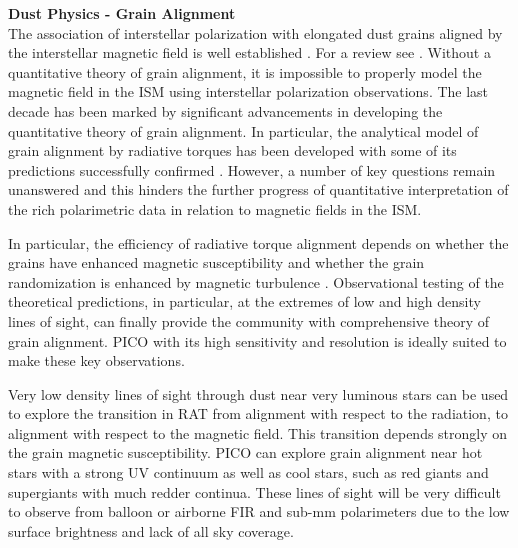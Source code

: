 \documentclass[PICOReport.tex]{subfiles}
\begin{document}
{\bf Dust Physics - Grain Alignment} \\[0.3cm]
The association of interstellar polarization with elongated dust grains aligned by the interstellar magnetic field is well established \citep{Hall1949,Hiltner1949, Purcell1979,Spitzer1979}. For a review see \cite{Andersson2015}. Without a quantitative theory of grain alignment, it is impossible to properly model the magnetic field in the ISM using interstellar polarization observations. The last decade has been marked by significant advancements in developing the quantitative theory of grain alignment. In particular, the analytical model of grain alignment by radiative torques \citep{Lazarian2007a} has been developed with some of its predictions successfully confirmed \citep{Andersson2007,Andersson2010}. However, a number of key questions remain unanswered and this hinders the further progress of quantitative interpretation of the rich polarimetric data in relation to magnetic fields in the ISM. 

In particular, the efficiency of radiative torque alignment depends on whether the grains have enhanced magnetic susceptibility \citep{Lazarian2007b,Hoang2015}and whether the grain randomization is enhanced by magnetic turbulence \citep{Weingartner2008}. Observational testing of the theoretical predictions, in particular, at the extremes of low and high density lines of sight, can finally provide the community with comprehensive theory of grain alignment. PICO with its high sensitivity and resolution is ideally suited to make these key observations.

Very low density lines of sight through dust near very luminous stars can be used to explore the transition in RAT from alignment with respect to the radiation, to alignment with respect to the magnetic field. This transition depends strongly on the grain magnetic susceptibility.  PICO can explore grain alignment near hot stars with a strong UV continuum as well as cool stars, such as red giants and supergiants with much redder continua. These lines of sight will be very difficult to observe from balloon or airborne FIR and sub-mm polarimeters due to the low surface brightness and lack of all sky coverage.
\end{document}
